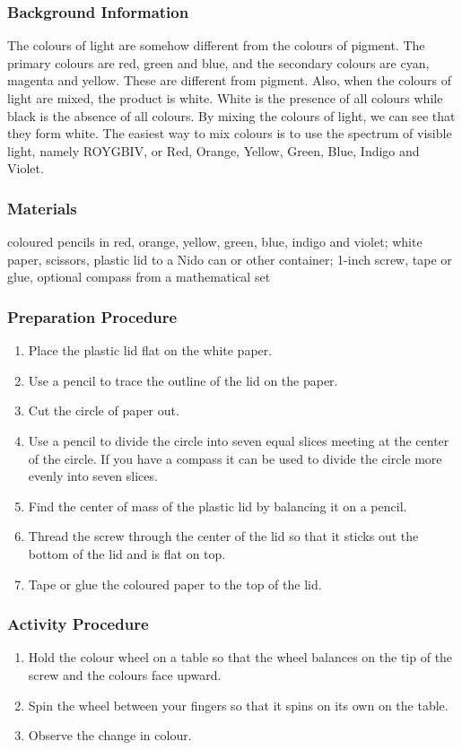 \subsubsection*{Background Information}
The colours of light are somehow different from the colours of pigment. The primary colours are red, green and blue, and the secondary colours are cyan, magenta and yellow. These are different from pigment. Also, when the colours of light are mixed, the product is white. White is the presence of all colours while black is the absence of all colours.  
By mixing the colours of light, we can see that they form white. The easiest way to mix colours is to use the spectrum of visible light, namely ROYGBIV, or Red, Orange, Yellow, Green, Blue, Indigo and Violet.  

\subsubsection*{Materials}
coloured pencils in red, orange, yellow, green, blue, indigo and violet; white paper, scissors, plastic lid to a Nido can or other container; 1-inch screw, tape or glue, optional compass from a mathematical set

\subsubsection*{Preparation Procedure}
\begin{enumerate}
\item{Place the plastic lid flat on the white paper.} 
\item{Use a pencil to trace the outline of the lid on the paper.} 
\item{Cut the circle of paper out.} 
\item{Use a pencil to divide the circle into seven equal slices meeting at the center of the circle.  If you have a compass it can be used to divide the circle more evenly into seven slices.} 
\item{Find the center of mass of the plastic lid by balancing it on a pencil.} 
\item{Thread the screw through the center of the lid so that it sticks out the bottom of the lid and is flat on top.} 
\item{Tape or glue the coloured paper to the top of the lid.} 
\end{enumerate}

\subsubsection*{Activity Procedure}
\begin{enumerate}
\item{Hold the colour wheel on a table so that the wheel balances on the tip of the screw and the colours face upward.} 
\item{Spin the wheel between your fingers so that it spins on its own on the table.} 
\item{Observe the change in colour.} 
\end{enumerate}

